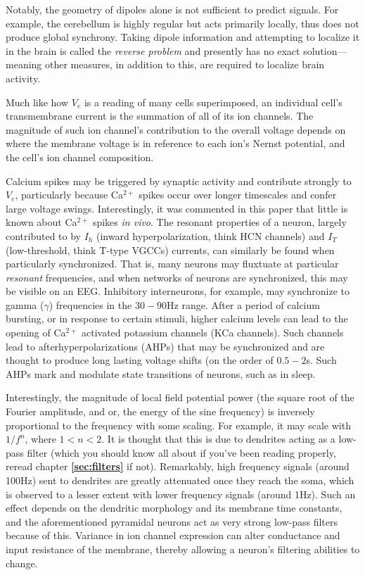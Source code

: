 Notably, the geometry of dipoles alone is not sufficient to predict signals. For example, the cerebellum is highly regular but acts primarily locally, thus does not produce global synchrony. Taking dipole information and attempting to localize it in the brain is called the \textit{reverse problem} and presently has no exact solution---meaning other measures, in addition to this, are required to localize brain activity.\newline
    
Much like how $V_e$ is a reading of many cells superimposed, an individual cell's transmembrane current is the summation of all of its ion channels. The magnitude of such ion channel's contribution to the overall voltage depends on where the membrane voltage is in reference to each ion's Nernst potential, and the cell's ion channel composition.\newline

    Calcium spikes may be triggered by synaptic activity and contribute strongly to $V_e$, particularly because Ca$^{2+}$ spikes occur over longer timescales and confer large voltage swings. Interestingly, it was commented in this paper that little is known about Ca$^{2+}$ spikes \textit{in vivo}. The resonant properties of a neuron, largely contributed to by $I_h$ (inward hyperpolarization, think HCN channels) and $I_T$ (low-threshold, think T-type VGCCs) currents, can similarly be found when particularly synchronized. That is, many neurons may fluxtuate at particular \textit{resonant} frequencies, and when networks of neurons are synchronized, this may be visible on an EEG. Inhibitory interneurons, for example, may synchronize to gamma ($\gamma$) frequencies in the $30-90$Hz range. After a period of calcium bursting, or in response to certain stimuli, higher calcium levels can lead to the opening of Ca$^{2+}$ activated potassium channels (KCa channels). Such channels lead to afterhyperpolarizations (AHPs) that may be synchronized and are thought to produce long lasting voltage shifts (on the order of $0.5-2$s. Such AHPs mark and modulate state transitions of neurons, such as in sleep.\newline

    Interestingly, the magnitude of local field potential power (the square root of the Fourier amplitude, and or, the energy of the sine frequency) is inversely proportional to the frequency with some scaling. For example, it may scale with $1/f^n$, where $1 < n < 2$. It is thought that this is due to dendrites acting as a low-pass filter (which you should know all about if you've been reading properly, reread chapter \textbf{\ref{sec:filters}} if not). Remarkably, high frequency signals (around 100Hz) sent to dendrites are greatly attenuated once they reach the soma, which is observed to a lesser extent with lower frequency signals (around 1Hz). Such an effect depends on the dendritic morphology and its membrane time constants, and the aforementioned pyramidal neurons act as very strong low-pass filters because of this. Variance in ion channel expression can alter conductance and input resistance of the membrane, thereby allowing a neuron's filtering abilities to change.\newline

